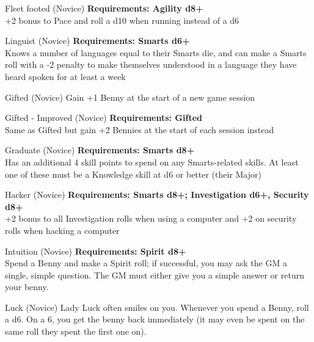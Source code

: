 \begin{multicols}{2}
\begin{genericsection}{Fleet footed (Novice)}
\textbf{Requirements: Agility d8+}\\
+2 bonus to Pace and roll a d10 when running instead of a d6
\end{genericsection}

\begin{genericsection}{Linguist (Novice)}
\textbf{Requirements: Smarts d6+}\\
Knows a number of languages equal to their Smarts die, and can make a Smarts roll with a -2 penalty to make themselves understood in a language they have heard spoken for at least a week
\end{genericsection}

\begin{genericsection}{Gifted (Novice)}
Gain +1 Benny at the start of a new game session
\end{genericsection}

\begin{genericsection}{Gifted - Improved (Novice)}
\textbf{Requirements: Gifted}\\
Same as Gifted but gain +2 Bennies at the start of each session instead
\end{genericsection}

\begin{genericsection}{Graduate (Novice)}
\textbf{Requirements: Smarts d8+}\\
Has an additional 4 skill points to spend on any Smarts-related skills. At least one of these must be a Knowledge skill at d6 or better (their Major)
\end{genericsection}

\begin{genericsection}{Hacker (Novice)}
\textbf{Requirements: Smarts d8+; Investigation d6+, Security d8+}\\
+2 bonus to all Investigation rolls when using a computer and +2 on security rolls when hacking a computer
\end{genericsection}

\begin{genericsection}{Intuition (Novice)}
\textbf{Requirements: Spirit d8+}\\
Spend a Benny and make a Spirit roll; if successful, you may ask the GM a single, simple question. The GM must either give you a simple answer or return your benny.
\end{genericsection}

\begin{genericsection}{Luck (Novice)}
Lady Luck often smiles on you. Whenever you spend a Benny, roll a d6. On a 6, you get the benny back immediately (it may even be spent on the same roll they spent the first one on).
\end{genericsection}


\end{multicols}

